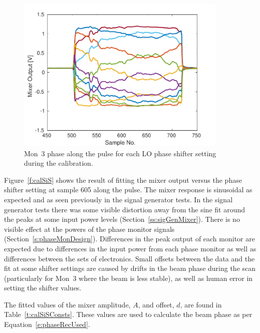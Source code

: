 \begin{figure}
  \centering
  \includegraphics[width=0.9\textwidth]{Figures/phaseMons/mon3AllPoints}
  \caption{Mon~3 phase along the pulse for each LO phase shifter setting during the calibration.}
  \label{f:mon3AllPoints}
\end{figure}

Figure~\ref{f:calSiS} shows the result of fitting the mixer output versus the phase shifter setting at sample 605 along the pulse. The mixer response is sinusoidal as expected and as seen previously in the signal generator tests. In the signal generator tests there was some visible distortion away from the sine fit around the peaks at some input power levels (Section~\ref{ss:sigGenMixer}). There is no visible effect at the powers of the phase monitor signals (Section~\ref{s:phaseMonDesign}). Differences in the peak output of each monitor are expected due to differences in the input power from each phase monitor as well as differences between the sets of electronics. Small offsets between the data and the fit at some shifter settings are caused by drifts in the beam phase during the scan (particularly for Mon~3 where the beam is less stable), as well as human error in setting the shifter values.

The fitted values of the mixer amplitude, \(A\), and offset, \(d\), are found in Table~\ref{t:calSiSConsts}. These values are used to calculate the beam phase as per Equation~\ref{e:phaseRecUsed}. 


